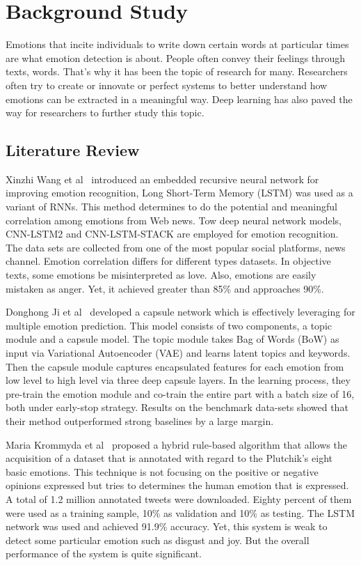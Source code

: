 \chapter{Background Study} \label{ch:literature_review}


Emotions that incite individuals to write down certain words at particular times are what emotion detection is about. People often convey their feelings through texts, words. That's why it has been the topic of research for many. Researchers often try to create or innovate or perfect systems to better understand how emotions can be extracted in a meaningful way. Deep learning has also paved the way for researchers to further study this topic.
\section{Literature Review}



Xinzhi Wang et al~\cite{ref1} introduced an embedded recursive neural network for improving emotion recognition, Long Short-Term Memory (LSTM) was used as a variant of RNNs. This method determines to do the potential and meaningful correlation among emotions from Web news. Tow deep neural network models, CNN-LSTM2 and CNN-LSTM-STACK are employed for emotion recognition. The data sets are collected from one of the most popular social platforms, news channel. Emotion correlation differs for different types datasets. In objective texts, some emotions be misinterpreted as love. Also, emotions are easily mistaken as anger. Yet, it achieved greater than 85\% and approaches 90\%.



Donghong Ji et al~\cite{ref2} developed a capsule network which is effectively leveraging for multiple emotion prediction. This model consists of two components, a topic module and a capsule model. The topic module takes Bag of Words (BoW) as input via Variational Autoencoder (VAE) and learns latent topics and keywords. Then the capsule module captures encapsulated features for each emotion from low level to high level via three deep capsule layers. In the learning process, they pre-train the emotion module and co-train the entire part with a batch size of 16, both under early-stop strategy. Results on the benchmark data-sets showed that their method outperformed strong baselines by a large margin.

Maria Krommyda et al~\cite{ref3} proposed a hybrid rule-based algorithm that allows the acquisition of a dataset that is annotated with regard to the Plutchik's eight basic emotions. This technique is not focusing on the positive or negative opinions expressed but tries to determines the human emotion that is expressed. A total of 1.2 million annotated tweets were downloaded. Eighty percent of them were used as a training sample, 10\% as validation and 10\% as testing. The LSTM network was used and achieved 91.9\% accuracy. Yet, this system is weak to detect some particular emotion such as disgust and joy. But the overall performance of the system is quite significant. 

